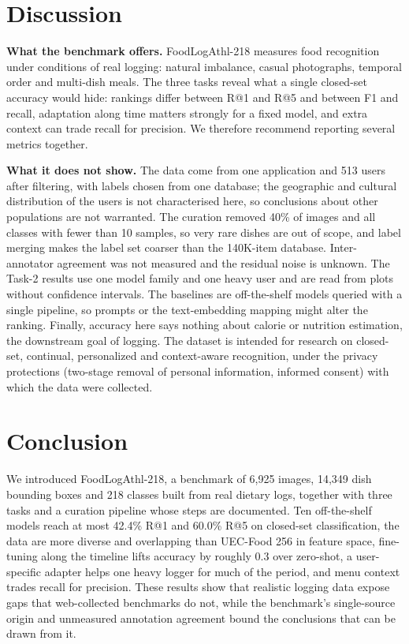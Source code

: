 \documentclass[sigconf, nonacm]{acmart}
\begin{document}


\section{Discussion}
\textbf{What the benchmark offers.} FoodLogAthl-218 measures food recognition under conditions of real logging: natural imbalance, casual photographs, temporal order and multi-dish meals. The three tasks reveal what a single closed-set accuracy would hide: rankings differ between R@1 and R@5 and between F1 and recall, adaptation along time matters strongly for a fixed model, and extra context can trade recall for precision. We therefore recommend reporting several metrics together.

\textbf{What it does not show.} The data come from one application and 513 users after filtering, with labels chosen from one database; the geographic and cultural distribution of the users is not characterised here, so conclusions about other populations are not warranted. The curation removed 40\% of images and all classes with fewer than 10 samples, so very rare dishes are out of scope, and label merging makes the label set coarser than the 140K-item database. Inter-annotator agreement was not measured and the residual noise is unknown. The Task-2 results use one model family and one heavy user and are read from plots without confidence intervals. The baselines are off-the-shelf models queried with a single pipeline, so prompts or the text-embedding mapping might alter the ranking. Finally, accuracy here says nothing about calorie or nutrition estimation, the downstream goal of logging. The dataset is intended for research on closed-set, continual, personalized and context-aware recognition, under the privacy protections (two-stage removal of personal information, informed consent) with which the data were collected.

\section{Conclusion}
We introduced FoodLogAthl-218, a benchmark of 6,925 images, 14,349 dish bounding boxes and 218 classes built from real dietary logs, together with three tasks and a curation pipeline whose steps are documented. Ten off-the-shelf models reach at most 42.4\% R@1 and 60.0\% R@5 on closed-set classification, the data are more diverse and overlapping than UEC-Food 256 in feature space, fine-tuning along the timeline lifts accuracy by roughly 0.3 over zero-shot, a user-specific adapter helps one heavy logger for much of the period, and menu context trades recall for precision. These results show that realistic logging data expose gaps that web-collected benchmarks do not, while the benchmark's single-source origin and unmeasured annotation agreement bound the conclusions that can be drawn from it.




\end{document}
